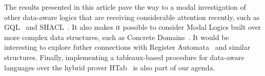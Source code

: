 \documentclass[10pt,a4paper]{amsart}
\theoremstyle{definition}
\theoremstyle{remark}
\begin{document}

The results presented in this article pave the way to a modal investigation of other data-aware logics that are receiving considerable attention recently, such as GQL~\cite{FrancisGGLMMMPR23,FrancisGGLMMMPR23b} and SHACL~\cite{Ortiz23,Ahmetaj0S23}. It also makes it possible to consider Modal Logics built over more complex data structures, such as Concrete Domains~\cite{DemriQ21}. It would be interesting to explore futher connections with Register Automata~\cite{KaminskiF94} and similar structures. Finally, implementing a tableaux-based procedure for data-aware languages over the hybrid prover \textsf{HTab}~\cite{Hoffmann2007} is also part of our agenda.
\end{document}
